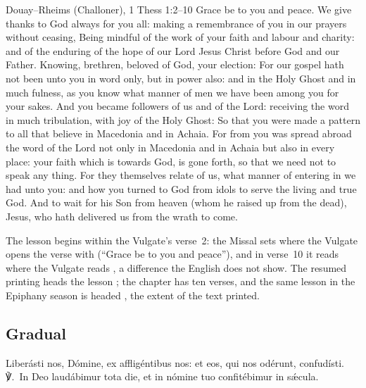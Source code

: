 \begin{englishwitness}{Douay--Rheims (Challoner), 1 Thess 1:2--10}
Grace be to you and peace. We give thanks to God always for you all: making a
remembrance of you in our prayers without ceasing, Being mindful of the work
of your faith and labour and charity: and of the enduring of the hope of our
Lord Jesus Christ before God and our Father. Knowing, brethren, beloved of
God, your election: For our gospel hath not been unto you in word only, but in
power also: and in the Holy Ghost and in much fulness, as you know what manner
of men we have been among you for your sakes. And you became followers of us
and of the Lord: receiving the word in much tribulation, with joy of the Holy
Ghost: So that you were made a pattern to all that believe in Macedonia and in
Achaia. For from you was spread abroad the word of the Lord not only in
Macedonia and in Achaia but also in every place: your faith which is towards
God, is gone forth, so that we need not to speak any thing. For they
themselves relate of us, what manner of entering in we had unto you: and how
you turned to God from idols to serve the living and true God. And to wait for
his Son from heaven (whom he raised up from the dead), Jesus, who hath
delivered us from the wrath to come.
\end{englishwitness}

\noindent The lesson begins within the Vulgate's verse~2: the Missal sets
 where the Vulgate opens the verse with  (``Grace be to you and peace''), and in verse~10 it reads  where the Vulgate reads , a difference the English
does not show. The resumed printing heads the lesson ; the chapter has ten verses, and the same lesson in the Epiphany season
is headed , the extent of the text printed.

\subsection{Gradual}
\label{proper-gradual}


\begin{latinproper}
Liberásti nos, Dómine, ex affligéntibus nos: et eos, qui nos odérunt,
confudísti. ℣.~In Deo laudábimur tota die, et in nómine tuo confitébimur in
sǽcula.
\end{latinproper}

